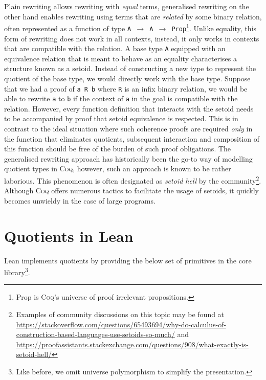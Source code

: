 \documentclass[12pt,twoside,maitrise]{dms}
\theoremstyle{definition}
\numberwithin{equation}{section}
\numberwithin{table}{chapter}
\numberwithin{figure}{chapter}
\newcommand\kw[1] {\textsf{#1}}
\newcommand\id[1] {\texttt{#1}}
\newcommand\fn[1] {\texttt{#1}}
\def\Coq{\textsc{Coq}\xspace}
\begin{document}
Plain rewriting allows rewriting with \emph{equal} terms, generalised
rewriting\cite{sozeau2009new, coq-gen-rewriting} on the other hand enables
rewriting using terms that are \emph{related} by some binary relation, often
represented as a function of type \fn{A $\rightarrow$ A $\rightarrow$
  \kw{Prop}}\footnote{\kw{Prop} is \Coq{}'s universe of proof irrelevant
propositions.}. Unlike equality, this form of rewriting does not work in all
contexts, instead, it only works in contexts that are compatible with the
relation. A base type \id{A} equipped with an equivalence relation that is meant
to behave as an equality characterises a structure known as a
setoid\cite{hofmann1995simple}. Instead of constructing a new type to represent
the quotient of the base type, we would directly work with the base type.
Suppose that we had a proof of \fn{a R b} where \id{R} is an infix binary
relation, we would be able to rewrite \id{a} to \id{b} if the context of \id{a}
in the goal is compatible with the relation. However, every function definition
that interacts with the setoid needs to be accompanied by proof that setoid
equivalence is respected. This is in contrast to the ideal situation where such
coherence proofs are required \emph{only} in the function that eliminates
quotients, subsequent interaction and composition of this function should be
free of the burden of such proof obligations. The generalised rewriting approach
has historically been the go-to way of modelling quotient types in \Coq{},
however, such an approach is known to be rather laborious. This phenomenon is
often designated as \emph{setoid hell} by the community\footnote{Examples of
community discussions on this topic may be found at
\url{https://stackoverflow.com/questions/65493694/why-do-calculus-of-construction-based-languages-use-setoids-so-much/}
and
\url{https://proofassistants.stackexchange.com/questions/908/what-exactly-is-setoid-hell/}}.
Although \Coq{} offers numerous tactics to facilitate the usage of setoids, it
quickly becomes unwieldy in the case of large programs.

\section{Quotients in Lean}\label{sec:intro-lean-quotients}

Lean implements quotients by providing the below set of primitives in the core
library\footnote{Like before, we omit universe polymorphism to simplify the
presentation.}.
\end{document}
